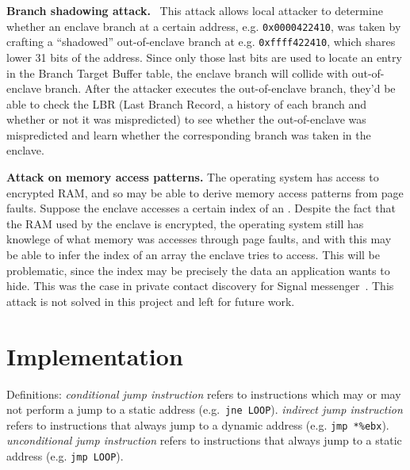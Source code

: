 \documentclass[sigplan, review]{acmart}
\begin{document}
\textbf{Branch shadowing attack.}~\cite{lee2016inferring} This attack allows local attacker to determine whether an enclave branch at a certain address, e.g. \texttt{0x0000422410}, was taken by crafting a ``shadowed'' out-of-enclave branch at e.g. \texttt{0xffff422410}, which shares lower 31 bits of the address. Since only those last bits are used to locate an entry in the Branch Target Buffer table, the enclave branch will collide with out-of-enclave branch. After the attacker executes the out-of-enclave branch, they'd be able to check the LBR (Last Branch Record, a history of each branch and whether or not it was mispredicted) to see whether the out-of-enclave was mispredicted and learn whether the corresponding branch was taken in the enclave.

\textbf{Attack on memory access patterns.} The operating system has access to encrypted RAM, and so may be able to derive memory access patterns from page faults. Suppose the enclave accesses a certain index of an . Despite the fact that the RAM used by the enclave is encrypted, the operating system still has knowlege of what memory was accesses through page faults, and with this may be able to infer the index of an array the enclave tries to access. This will be problematic, since the index may be precisely the data an application wants to hide. This was the case in private contact discovery for Signal messenger~\cite{signalprivaterecovery}. This attack is not solved in this project and left for future work.

\section{Implementation}
Definitions: \textit{conditional jump instruction} refers to instructions which may or may not perform a jump to a static address (e.g.\ \texttt{jne LOOP}). \textit{indirect jump instruction} refers to instructions that always jump to a dynamic address (e.g. \texttt{jmp *\%ebx}). \textit{unconditional jump instruction} refers to instructions that always jump to a static address (e.g. \texttt{jmp LOOP}).
\end{document}

